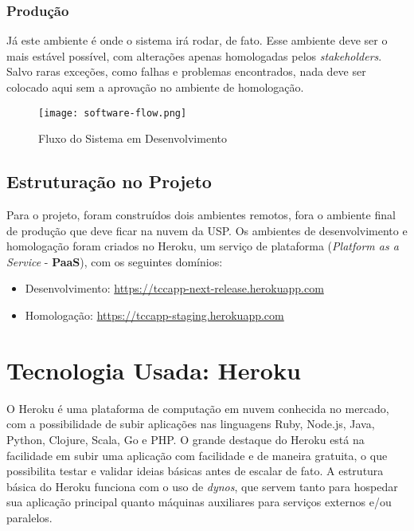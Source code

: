 \subsubsection{Produção}
Já este ambiente é onde o sistema irá rodar, de fato. Esse ambiente deve ser o mais estável possível, com alterações apenas homologadas pelos \textit{stakeholders}. Salvo raras exceções, como falhas e problemas encontrados, nada deve ser colocado aqui sem a aprovação no ambiente de homologação.

\begin{figure}[H]
    \centering
    \texttt{[image: software-flow.png]}
    \caption{Fluxo do Sistema em Desenvolvimento\cite{atlassiansupport2018}}
    \label{fig:software-flow}
\end{figure}

\subsection{Estruturação no Projeto}
Para o projeto, foram construídos dois ambientes remotos, fora o ambiente final de produção que deve ficar na nuvem da USP. Os ambientes de desenvolvimento e homologação foram criados no Heroku, um serviço de plataforma (\textit{Platform as a Service} - \textbf{PaaS}), com os seguintes domínios:

\begin{itemize}
    \item Desenvolvimento: \href{https://tccapp-next-release.herokuapp.com}{https://tccapp-next-release.herokuapp.com}
    \item Homologação: \href{https://tccapp-staging.herokuapp.com}{https://tccapp-staging.herokuapp.com}
\end{itemize}

\section{Tecnologia Usada: Heroku\cite{lucasarthurfelgueiras2018}}

O Heroku é uma plataforma de computação em nuvem conhecida no mercado, com a possibilidade de subir aplicações nas linguagens Ruby, Node.js, Java, Python, Clojure, Scala, Go e PHP. O grande destaque do Heroku está na facilidade em subir uma aplicação com facilidade e de maneira gratuita, o que possibilita testar e validar ideias básicas antes de escalar de fato. A estrutura básica do Heroku funciona com o uso de \textit{dynos}, que servem tanto para hospedar sua aplicação principal quanto máquinas auxiliares para serviços externos e/ou paralelos.

